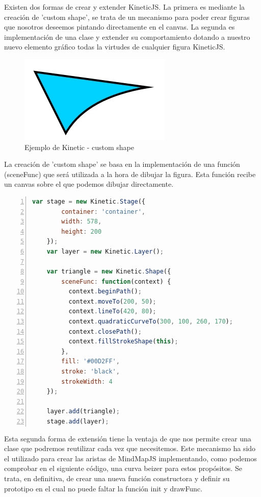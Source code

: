 Existen dos formas de crear y extender KineticJS. La primera es mediante la creación de 'custom shape', se trata de un mecanismo para poder crear figuras que nosotros deseemos pintando directamente en el canvas. La segunda es implementación de una clase y extender su comportamiento dotando a nuestro nuevo elemento gráfico todas la virtudes de cualquier figura KineticJS.

\begin{figure}[tbph]
\centering
\includegraphics[width=0.6\linewidth]{imagenes/KineticjsEjemplo2.png}
\caption{Ejemplo de Kinetic - custom shape}
\label{fig:kinetic-ejemplo-customshape}
\end{figure}

La creación de 'custom shape' se basa en la implementación de una función (sceneFunc) que será utilizada a la hora de dibujar la figura. Esta función recibe un canvas sobre el que podemos dibujar directamente. 

\begin{lstlisting}[language=JavaScript, numbers=left]
	var stage = new Kinetic.Stage({
        container: 'container',
        width: 578,
        height: 200
    });
    var layer = new Kinetic.Layer();

    var triangle = new Kinetic.Shape({
        sceneFunc: function(context) {
          context.beginPath();
          context.moveTo(200, 50);
          context.lineTo(420, 80);
          context.quadraticCurveTo(300, 100, 260, 170);
          context.closePath();
          context.fillStrokeShape(this);
        },
        fill: '#00D2FF',
        stroke: 'black',
        strokeWidth: 4
    });

    layer.add(triangle);
    stage.add(layer);
\end{lstlisting}

Esta segunda forma de extensión tiene la ventaja de que nos permite crear una clase que podremos reutilizar cada vez que necesitemos. Este mecanismo ha sido el utilizado para crear las aristas de MindMapJS implementando, como podemos comprobar en el siguiente código, una curva beizer para estos propósitos. Se trata, en definitiva, de crear una nueva función constructora y definir su prototipo en el cual no puede faltar la función init y drawFunc. 



